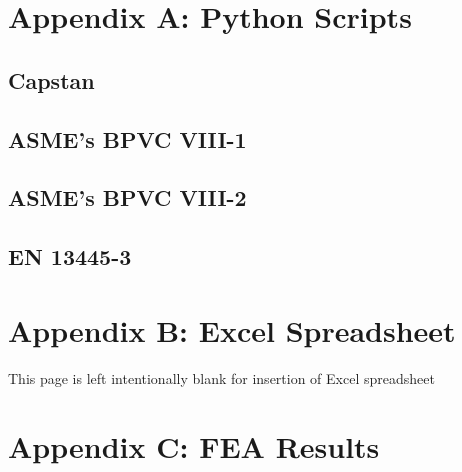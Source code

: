 \renewcommand{\thesection}{A.\arabic{section}}
\chapter{Appendix A: Python Scripts}
\label{appendix:a}
\nopagebreak
\begin{small}
	
	\section{Capstan}
	\label{appendix:a0}
	
	\pagebreak	
	
	\section{ASME's BPVC VIII-1}
	\label{appendix:a1}
	
	\pagebreak
	
	\section{ASME's BPVC VIII-2}
	\label{appendix:a2}
	
	\pagebreak
	
	\section{EN 13445-3}
	\label{appendix:a3}
	

\end{small}

\renewcommand{\thesection}{B.\arabic{section}}
\chapter{Appendix B: Excel Spreadsheet}
\label{appendix:b}

\vfill
\begin{center}
This page is left intentionally blank for insertion of Excel spreadsheet
\end{center}
\vfill



\renewcommand{\thesection}{C.\arabic{section}}
\chapter{Appendix C: FEA Results}
\label{appendix:c}